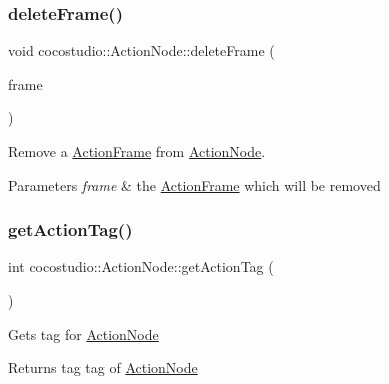 \subsubsection{\texorpdfstring{delete\+Frame()}{deleteFrame()}\hspace{0.1cm}{\footnotesize\ttfamily [2/2]}}
{\footnotesize\ttfamily void cocostudio\+::\+Action\+Node\+::delete\+Frame (\begin{DoxyParamCaption}\item[{\hyperlink{classcocostudio_1_1ActionFrame}{Action\+Frame} $\ast$}]{frame }\end{DoxyParamCaption})}

Remove a \hyperlink{classcocostudio_1_1ActionFrame}{Action\+Frame} from \hyperlink{classcocostudio_1_1ActionNode}{Action\+Node}.


\begin{DoxyParams}{Parameters}
{\em frame} & the \hyperlink{classcocostudio_1_1ActionFrame}{Action\+Frame} which will be removed \\
\hline
\end{DoxyParams}
\mbox{\label{classcocostudio_1_1ActionNode_aa444087ebd76949143dcb9adad98dc93}} 
\subsubsection{\texorpdfstring{get\+Action\+Tag()}{getActionTag()}\hspace{0.1cm}{\footnotesize\ttfamily [1/2]}}
{\footnotesize\ttfamily int cocostudio\+::\+Action\+Node\+::get\+Action\+Tag (\begin{DoxyParamCaption}{ }\end{DoxyParamCaption})}

Gets tag for \hyperlink{classcocostudio_1_1ActionNode}{Action\+Node}

\begin{DoxyReturn}{Returns}
tag tag of \hyperlink{classcocostudio_1_1ActionNode}{Action\+Node} 
\end{DoxyReturn}
\mbox{\label{classcocostudio_1_1ActionNode_aa444087ebd76949143dcb9adad98dc93}} 
